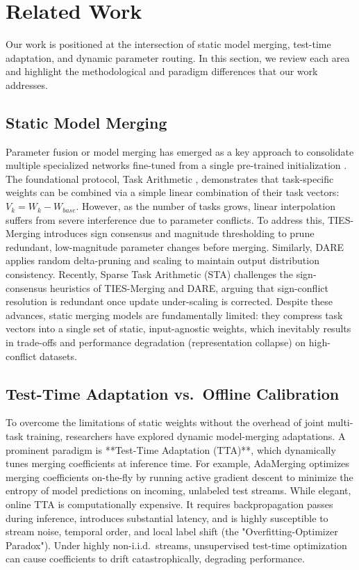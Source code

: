 \section{Related Work}
\label{sec:related_work}

Our work is positioned at the intersection of static model merging, test-time adaptation, and dynamic parameter routing. In this section, we review each area and highlight the methodological and paradigm differences that our work addresses.

\subsection{Static Model Merging}
Parameter fusion or model merging has emerged as a key approach to consolidate multiple specialized networks fine-tuned from a single pre-trained initialization \cite{task_arithmetic, ties_merging, dare}. The foundational protocol, Task Arithmetic \cite{task_arithmetic}, demonstrates that task-specific weights can be combined via a simple linear combination of their task vectors: $V_k = W_k - W_{base}$. However, as the number of tasks grows, linear interpolation suffers from severe interference due to parameter conflicts. 
To address this, TIES-Merging \cite{ties_merging} introduces sign consensus and magnitude thresholding to prune redundant, low-magnitude parameter changes before merging. Similarly, DARE \cite{dare} applies random delta-pruning and scaling to maintain output distribution consistency. Recently, Sparse Task Arithmetic (STA) \cite{sparse_task_arithmetic} challenges the sign-consensus heuristics of TIES-Merging and DARE, arguing that sign-conflict resolution is redundant once update under-scaling is corrected.
Despite these advances, static merging models are fundamentally limited: they compress task vectors into a single set of static, input-agnostic weights, which inevitably results in trade-offs and performance degradation (representation collapse) on high-conflict datasets.

\subsection{Test-Time Adaptation vs.\ Offline Calibration}
To overcome the limitations of static weights without the overhead of joint multi-task training, researchers have explored dynamic model-merging adaptations. A prominent paradigm is **Test-Time Adaptation (TTA)**, which dynamically tunes merging coefficients at inference time. For example, AdaMerging \cite{adamerging} optimizes merging coefficients on-the-fly by running active gradient descent to minimize the entropy of model predictions on incoming, unlabeled test streams. 
While elegant, online TTA is computationally expensive. It requires backpropagation passes during inference, introduces substantial latency, and is highly susceptible to stream noise, temporal order, and local label shift (the "Overfitting-Optimizer Paradox"). Under highly non-i.i.d.\ streams, unsupervised test-time optimization can cause coefficients to drift catastrophically, degrading performance.

